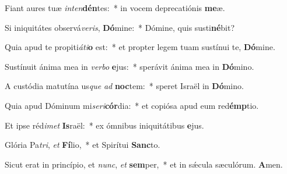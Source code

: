 \vs Fiant aures tuæ \textit{in}\textit{ten}\textbf{dén}tes:~* in vocem deprecatiónis \textbf{me}æ.

\vs Si iniquitátes observá\textit{ve}\textit{ris}, \textbf{Dó}mine:~* Dómine, quis susti\textbf{né}bit?

\vs Quia apud te propiti\textit{á}\textit{ti}\textbf{o} est:~* et propter legem tuam sustínui te, \textbf{Dó}mine.

\vs Sustínuit ánima mea in \textit{ver}\textit{bo} \textbf{e}jus:~* sperávit ánima mea in \textbf{Dó}mino.

\vs A custódia matutína us\textit{que} \textit{ad} \textbf{noc}tem:~* speret Israël in \textbf{Dó}mino.

\vs Quia apud Dóminum mi\textit{se}\textit{ri}\textbf{cór}dia:~* et copiósa apud eum red\textbf{émp}tio.

\vs Et ipse réd\textit{i}\textit{met} \textbf{Is}raël:~* ex ómnibus iniquitátibus \textbf{e}jus.

\vs Glória Pa\textit{tri}, \textit{et} \textbf{Fí}lio,~* et Spirítui \textbf{Sanc}to.

\vs Sicut erat in princípio, et \textit{nunc}, \textit{et} \textbf{sem}per,~* et in sǽcula sæculórum. \textbf{A}men.
